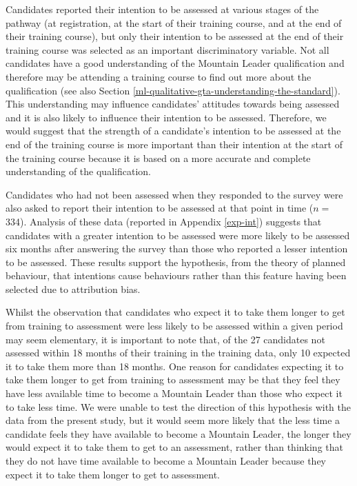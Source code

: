 \documentclass[
  12pt,
  a4paper,
]{book}
\begin{document}
Candidates reported their intention to be assessed at various stages of the pathway (at registration, at the start of their training course, and at the end of their training course), but only their intention to be assessed at the end of their training course was selected as an important discriminatory variable. Not all candidates have a good understanding of the Mountain Leader qualification and therefore may be attending a training course to find out more about the qualification (see also Section \ref{ml-qualitative-gta-understanding-the-standard}). This understanding may influence candidates' attitudes towards being assessed and it is also likely to influence their intention to be assessed. Therefore, we would suggest that the strength of a candidate's intention to be assessed at the end of the training course is more important than their intention at the start of the training course because it is based on a more accurate and complete understanding of the qualification.

Candidates who had not been assessed when they responded to the survey were also asked to report their intention to be assessed at that point in time (\(n =\) 334). Analysis of these data (reported in Appendix \ref{exp-int}) suggests that candidates with a greater intention to be assessed were more likely to be assessed six months after answering the survey than those who reported a lesser intention to be assessed. These results support the hypothesis, from the theory of planned behaviour, that intentions cause behaviours rather than this feature having been selected due to attribution bias.

Whilst the observation that candidates who expect it to take them longer to get from training to assessment were less likely to be assessed within a given period may seem elementary, it is important to note that, of the 27 candidates not assessed within 18 months of their training in the training data, only 10 expected it to take them more than 18 months. One reason for candidates expecting it to take them longer to get from training to assessment may be that they feel they have less available time to become a Mountain Leader than those who expect it to take less time. We were unable to test the direction of this hypothesis with the data from the present study, but it would seem more likely that the less time a candidate feels they have available to become a Mountain Leader, the longer they would expect it to take them to get to an assessment, rather than thinking that they do not have time available to become a Mountain Leader because they expect it to take them longer to get to assessment.
\end{document}
